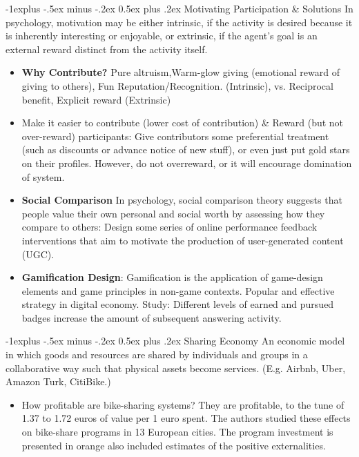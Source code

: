 \documentclass[12pt, landscape]{article}
\makeatletter
\renewcommand{\subsection}{\@startsection{subsection}{2}{0mm}%
                                {-1explus -.5ex minus -.2ex}%
                                {0.5ex plus .2ex}%
                                {\normalfont\normalsize\bfseries}}
\makeatother
\begin{document}
\begin{multicols*}{3}
\subsection{Motivating Participation \& Solutions}
In psychology, motivation may be either intrinsic, if the activity is desired because it is inherently interesting or enjoyable, or extrinsic, if the agent's goal is an external reward distinct from the activity itself.
\begin{itemize}
\item \textbf{Why Contribute?} Pure altruism,Warm-glow giving (emotional reward of giving to others), Fun Reputation/Recognition. (Intrinsic), vs. Reciprocal benefit, Explicit reward (Extrinsic)
\item Make it easier to contribute (lower cost of contribution) \& Reward (but not over-reward) participants: Give contributors some preferential treatment (such as discounts or advance notice of new stuff), or even just put gold stars on their profiles. However, do not overreward, or it will encourage domination of system.
\item \textbf{Social Comparison} In psychology, social comparison theory suggests that people value their own personal and social worth by assessing how they compare to others: Design some series of online performance feedback interventions that aim to motivate the production of user-generated content (UGC).
\item \textbf{Gamification Design}: Gamification is the application of game-design elements and game principles in non-game contexts. Popular and effective strategy in digital economy. Study: Different levels of earned and pursued badges increase the amount of subsequent answering activity.
\end{itemize}

\subsection{Sharing Economy}
An economic model in which goods and resources are shared by individuals and groups in a collaborative way such that physical assets become services. (E.g. Airbnb, Uber, Amazon Turk, CitiBike.)
\begin{itemize}
\item How profitable are bike-sharing systems? They are profitable, to the tune of 1.37 to 1.72 euros of value per 1 euro spent. The authors studied these effects on bike-share programs in 13 European cities. The program investment is presented in orange also included estimates of the positive externalities.
\end{itemize}
\columnbreak


\end{multicols*}
\end{document}
